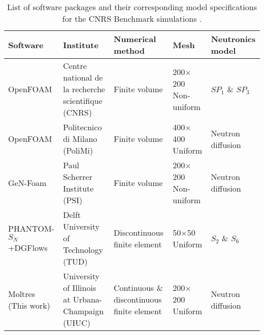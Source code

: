 \begin{landscape}
\begin{table*}[p]
    \caption{List of software packages and their corresponding model
    specifications for the CNRS Benchmark simulations
    \cite{tiberga_results_2020}.}
    \centering
    \begin{tabular}{p{4.2cm} p{7cm} p{3.3cm} p{2cm} p{2.7cm}}
        \toprule
        Software & Institute & Numerical method & Mesh & Neutronics model \\
        \midrule
        OpenFOAM & Centre national de la recherche scientifique (CNRS) & Finite volume & 200$\times$200 \newline Non-uniform & $SP_1$ \& $SP_3$ \\
        OpenFOAM & Politecnico di Milano (PoliMi) & Finite volume & 400$\times$400 \newline Uniform & Neutron diffusion \\
        GeN-Foam & Paul Scherrer Institute (PSI) & Finite volume & 200$\times$200 \newline Non-uniform & Neutron diffusion \\
        PHANTOM-$S_N$+DGFlows & Delft University of Technology (TUD) & Discontinuous finite \newline element & 50$\times$50 \newline Uniform & $S_2$ \& $S_6$ \\
        Moltres (This work) & University of Illinois at Urbana-Champaign (UIUC) & Continuous \& discontinuous finite element & 200$\times$200 \newline Uniform & Neutron diffusion \\
        \bottomrule
    \end{tabular}
    \label{table:software}
\end{table*}
\end{landscape}

\FloatBarrier